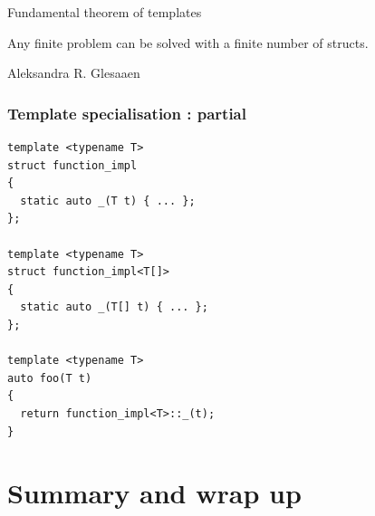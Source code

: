 \documentclass[14pt]{beamer}
\begin{document}
\begin{frame}

  \begin{center}\fontsize{16pt}{16pt}\selectfont\color{Tropiteal}
    Fundamental theorem of templates
  \end{center}

  \vspace{.25cm}
  \begin{center}
    \begin{minipage}{8cm}
      Any finite problem can be solved with a finite number of structs.
    \end{minipage}
  \end{center}

  \vspace{.25cm}
  \begin{flushright}\color{ICantExpress!50!WhiteTrash}
    Aleksandra R. Glesaaen
  \end{flushright}

\end{frame}

\begin{frame}[fragile]
  \frametitle{Template specialisation : partial}

  \begin{lstlisting}[basicstyle=\codefontsize{10pt}]
template <typename T>
struct function_impl
{ 
  static auto _(T t) { ... };
};

template <typename T>
struct function_impl<T[]>
{
  static auto _(T[] t) { ... };
};

template <typename T>
auto foo(T t)
{
  return function_impl<T>::_(t);
}
  \end{lstlisting}

\end{frame}

\section{Summary and wrap up}
\frame{\sectionpage}
\end{document}
